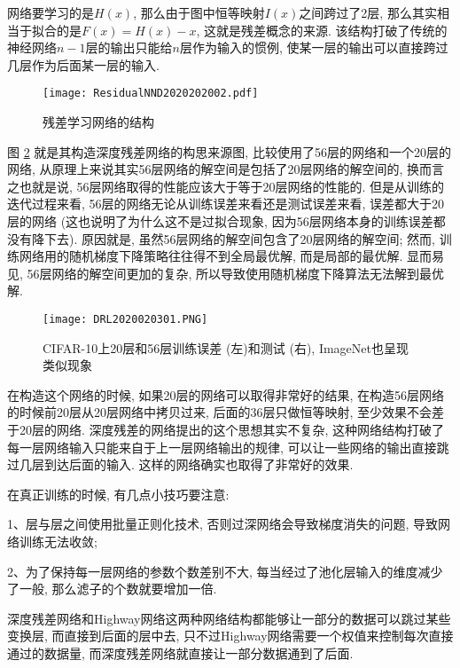 网络要学习的是$H(x)$, 那么由于图中恒等映射$I(x)$之间跨过了2层, 那么其实相当于拟合的是$F(x)=H (x)-x$, 这就是残差概念的来源.
该结构打破了传统的神经网络$n-1$层的输出只能给$n$层作为输入的惯例, 使某一层的输出可以直接跨过几层作为后面某一层的输入.
\begin{figure}[H]
    \centering
    \texttt{[image: ResidualNND2020202002.pdf]}
    \caption{残差学习网络的结构}
    \label{ResidualNND2020202002}
    \vspace{-0.4cm}
\end{figure}
图 \ref{DRL2020020301} 就是其构造深度残差网络的构思来源图, 比较使用了56层的网络和一个20层的网络,
从原理上来说其实56层网络的解空间是包括了20层网络的解空间的, 换而言之也就是说, 56层网络取得的性能应该大于等于20层网络的性能的.
但是从训练的迭代过程来看, 56层的网络无论从训练误差来看还是测试误差来看,
误差都大于20层的网络 (这也说明了为什么这不是过拟合现象, 因为56层网络本身的训练误差都没有降下去).
原因就是, 虽然56层网络的解空间包含了20层网络的解空间;
然而, 训练网络用的随机梯度下降策略往往得不到全局最优解, 而是局部的最优解.
显而易见, 56层网络的解空间更加的复杂, 所以导致使用随机梯度下降算法无法解到最优解.
\begin{figure}[H]
    \centering
    \texttt{[image: DRL2020020301.PNG]}
    \caption{CIFAR-10上20层和56层训练误差 (左)和测试 (右), ImageNet也呈现类似现象}
    \label{DRL2020020301}
    \vspace{-0.4cm}
\end{figure}

在构造这个网络的时候, 如果20层的网络可以取得非常好的结果,
在构造56层网络的时候前20层从20层网络中拷贝过来,
后面的36层只做恒等映射, 至少效果不会差于20层的网络.
深度残差的网络提出的这个思想其实不复杂, 这种网络结构打破了每一层网络输入只能来自于上一层网络输出的规律,
可以让一些网络的输出直接跳过几层到达后面的输入.
这样的网络确实也取得了非常好的效果.
\begin{remark}
在真正训练的时候, 有几点小技巧要注意:

1、层与层之间使用批量正则化技术, 否则过深网络会导致梯度消失的问题, 导致网络训练无法收敛;

2、为了保持每一层网络的参数个数差别不大, 每当经过了池化层输入的维度减少了一般, 那么滤子的个数就要增加一倍.
\end{remark}
\begin{remark}
    深度残差网络和Highway网络这两种网络结构都能够让一部分的数据可以跳过某些变换层,
    而直接到后面的层中去, 只不过Highway网络需要一个权值来控制每次直接通过的数据量, 而深度残差网络就直接让一部分数据通到了后面.
\end{remark}
